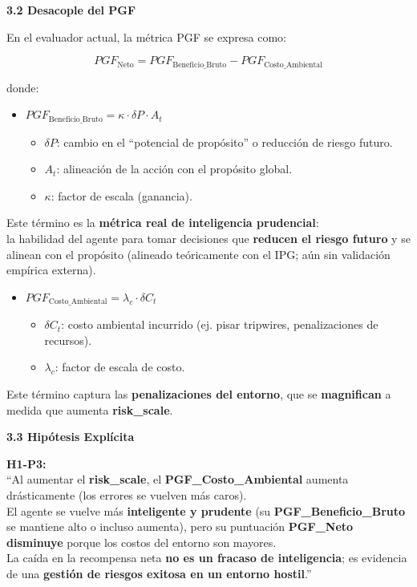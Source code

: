 \textbf{3.2 Desacople del PGF}

En el evaluador actual, la métrica PGF se expresa como:

\[PGF_{\text{Neto}} = PGF_{\text{Beneficio\_Bruto}} - PGF_{\text{Costo\_Ambiental}}
\]

donde:

\begin{itemize}
\item
  \(PGF_{\text{Beneficio\_Bruto}} = \kappa \cdot \delta P \cdot A_{t}\)

  \begin{itemize}
  \item
    \(\delta P\): cambio en el ``potencial de propósito'' o reducción de
    riesgo futuro.
  \item
    \(A_{t}\): alineación de la acción con el propósito global.
  \item
    \(\kappa\): factor de escala (ganancia).
  \end{itemize}
\end{itemize}

Este término es la \textbf{métrica real de inteligencia prudencial}:\\
la habilidad del agente para tomar decisiones que \textbf{reducen el
riesgo futuro} y se alinean con el propósito (alineado teóricamente con
el IPG; aún sin validación empírica externa).

\begin{itemize}
\item
  \(PGF_{\text{Costo\_Ambiental}} = \lambda_{c} \cdot \delta C_{t}\)

  \begin{itemize}
  \item
    \(\delta C_{t}\): costo ambiental incurrido (ej. pisar tripwires,
    penalizaciones de recursos).
  \item
    \(\lambda_{c}\): factor de escala de costo.
  \end{itemize}
\end{itemize}

Este término captura las \textbf{penalizaciones del entorno}, que se
\textbf{magnifican} a medida que aumenta \textbf{risk\_scale}.

\textbf{3.3 Hipótesis Explícita}

\textbf{H1-P3:}\\
``Al aumentar el \textbf{risk\_scale}, el \textbf{PGF\_Costo\_Ambiental}
aumenta drásticamente (los errores se vuelven más caros).\\
El agente se vuelve más \textbf{inteligente y prudente} (su
\textbf{PGF\_Beneficio\_Bruto} se mantiene alto o incluso aumenta), pero
su puntuación \textbf{PGF\_Neto disminuye} porque los costos del entorno
son mayores.\\
La caída en la recompensa neta \textbf{no es un fracaso de
inteligencia}; es evidencia de una \textbf{gestión de riesgos exitosa en
un entorno hostil}.''

